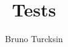 \documentclass{article}
\renewcommand{\(}{\left(}
\renewcommand{\)}{\right)}
\renewcommand{\[}{\left[}
\renewcommand{\]}{\right]}
\begin{document}
\title{Tests}
\author{Bruno Turcksin} 
\date{}
\maketitle








\end{document}
